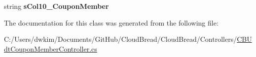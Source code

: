 \begin{DoxyCompactItemize}
\item 
string {\bfseries s\+Col10\+\_\+\+Coupon\+Member}\hypertarget{class_cloud_bread_1_1_controllers_1_1_c_b_udt_coupon_member_controller_1_1_input_params_a823a5e85ddd16922ef1c24badf5381b8}{}\label{class_cloud_bread_1_1_controllers_1_1_c_b_udt_coupon_member_controller_1_1_input_params_a823a5e85ddd16922ef1c24badf5381b8}

\end{DoxyCompactItemize}


The documentation for this class was generated from the following file\+:\begin{DoxyCompactItemize}
\item 
C\+:/\+Users/dwkim/\+Documents/\+Git\+Hub/\+Cloud\+Bread/\+Cloud\+Bread/\+Controllers/\hyperlink{_c_b_udt_coupon_member_controller_8cs}{C\+B\+Udt\+Coupon\+Member\+Controller.\+cs}\end{DoxyCompactItemize}
